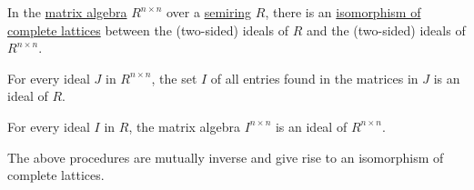 \begin{proposition}\label{thm:matrix_algebra_ideals}
  In the \hyperref[thm:matrix_algebra]{matrix algebra} \( R^{n \times n} \) over a \hyperref[def:semiring]{semiring} \( R \), there is an \hyperref[def:semilattice/homomorphism]{isomorphism of complete lattices} between the (two-sided) ideals of \( R \) and the (two-sided) ideals of \( R^{n \times n} \).

  \begin{thmenum}
     For every ideal \( J \) in \( R^{n \times n} \), the set \( I \) of all entries found in the matrices in \( J \) is an ideal of \( R \).

     For every ideal \( I \) in \( R \), the matrix algebra \( I^{n \times n} \) is an ideal of \( R^{n \times n} \).

     The above procedures are mutually inverse and give rise to an isomorphism of complete lattices.
  \end{thmenum}
\end{proposition}
